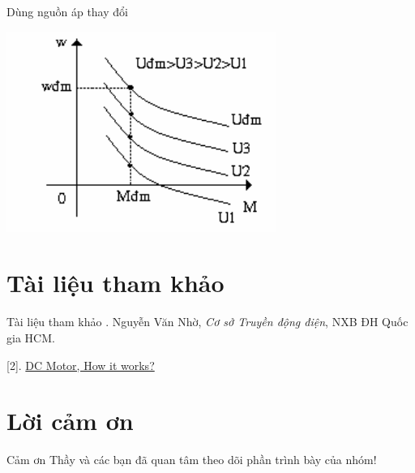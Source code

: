 \documentclass[24pt]{beamer}
\begin{document}
\begin{frame}{Dùng nguồn áp thay đổi}
\vspace{-.3cm}
\begin{center}
	\includegraphics[scale=.75]{images-chude4/khongdong-kichtu-noitiep-2-1.png} 
\end{center}
\end{frame}

\section*{Tài liệu tham khảo}
\begin{frame}{Tài liệu tham khảo}
\justifying
[1]. Nguyễn Văn Nhờ, \textit{Cơ sở Truyền động điện}, NXB ĐH Quốc gia HCM.

[2]. \href{https://www.youtube.com/watch?v=LAtPHANEfQo}{DC Motor, How it works?}
\end{frame}
\section*{Lời cảm ơn}
\begin{frame}
\justifying
\large \alert{Cảm ơn Thầy và các bạn đã quan tâm theo dõi phần trình bày của nhóm!}
\end{frame}
\end{document}
